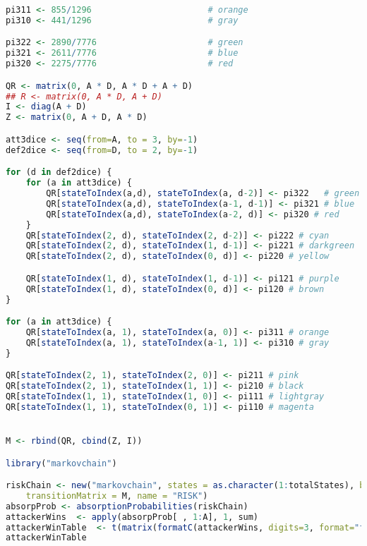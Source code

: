 \begin{description}
\begin{lstlisting}[language=R]
pi311 <- 855/1296                       # orange
pi310 <- 441/1296                       # gray

pi322 <- 2890/7776                      # green
pi321 <- 2611/7776                      # blue
pi320 <- 2275/7776                      # red

QR <- matrix(0, A * D, A * D + A + D)
## R <- matrix(0, A * D, A + D)
I <- diag(A + D)
Z <- matrix(0, A + D, A * D)

att3dice <- seq(from=A, to = 3, by=-1)
def2dice <- seq(from=D, to = 2, by=-1)

for (d in def2dice) {
    for (a in att3dice) {
        QR[stateToIndex(a,d), stateToIndex(a, d-2)] <- pi322   # green
        QR[stateToIndex(a,d), stateToIndex(a-1, d-1)] <- pi321 # blue
        QR[stateToIndex(a,d), stateToIndex(a-2, d)] <- pi320 # red
    }
    QR[stateToIndex(2, d), stateToIndex(2, d-2)] <- pi222 # cyan
    QR[stateToIndex(2, d), stateToIndex(1, d-1)] <- pi221 # darkgreen
    QR[stateToIndex(2, d), stateToIndex(0, d)] <- pi220 # yellow

    QR[stateToIndex(1, d), stateToIndex(1, d-1)] <- pi121 # purple
    QR[stateToIndex(1, d), stateToIndex(0, d)] <- pi120 # brown
}

for (a in att3dice) {
    QR[stateToIndex(a, 1), stateToIndex(a, 0)] <- pi311 # orange
    QR[stateToIndex(a, 1), stateToIndex(a-1, 1)] <- pi310 # gray
}

QR[stateToIndex(2, 1), stateToIndex(2, 0)] <- pi211 # pink
QR[stateToIndex(2, 1), stateToIndex(1, 1)] <- pi210 # black
QR[stateToIndex(1, 1), stateToIndex(1, 0)] <- pi111 # lightgray
QR[stateToIndex(1, 1), stateToIndex(0, 1)] <- pi110 # magenta


M <- rbind(QR, cbind(Z, I))

library("markovchain")

riskChain <- new("markovchain", states = as.character(1:totalStates), byrow = TRUE, 
    transitionMatrix = M, name = "RISK")
absorpProb <- absorptionProbabilities(riskChain)
attackerWins  <- apply(absorpProb[ , 1:A], 1, sum)
attackerWinTable  <- t(matrix(formatC(attackerWins, digits=3, format="f"), A,D))
attackerWinTable
\end{lstlisting}





\end{description}
